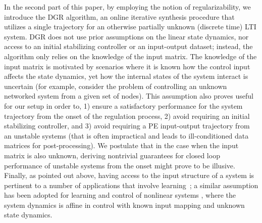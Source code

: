 \documentclass[journal]{IEEEtran}
\theoremstyle{definition}
\theoremstyle{remark}
\begin{document}
	
	In the second part of this paper, by employing the notion of regularizability, we introduce the \acf{DGR} algorithm, an online iterative synthesis procedure that utilizes a single trajectory for an otherwise partially unknown (discrete time) LTI system.
    {\color{PineGreen}\ac{DGR} does not use prior assumptions on the linear state dynamics, nor access to an initial stabilizing  controller or an input-output dataset; instead, the algorithm only relies on the knowledge of the input matrix.
	The knowledge of the input matrix is motivated by scenarios where it is known how the control input affects the state dynamics, yet how the internal states of the system interact is uncertain (for example, consider the problem of controlling an unknown networked system from a given set of nodes).
	This assumption also proves useful for our setup in order to, 1) ensure a satisfactory performance for the system trajectory from the onset of the regulation process, 2) avoid requiring an initial stabilizing controller, and 3) avoid requiring a PE input-output trajectory from an unstable systems (that is often impractical and leads to ill-conditioned data matrices for post-processing). We postulate that
	in the case when the input matrix is also unknown, deriving nontrivial guarantees for closed loop performance of unstable systems from the onset might prove to be illusive.
	Finally, as pointed out above, having access to the input structure of a system is pertinent to a number of applications that involve learning~\cite{vrabie2009adaptive, wagenmaker2020active, nozari2017network, sharf2018network}; a similar assumption has been adopted for learning and control of nonlinear systems \cite{jagtap2020control}, where the system dynamics is affine in control with known input mapping and unknown state dynamics.}
	
\end{document}
